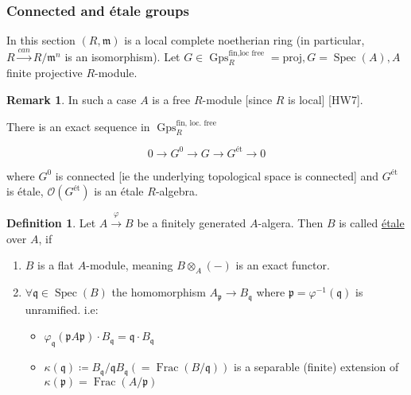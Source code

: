 \documentclass{article}
\theoremstyle{definition}
\newtheorem*{definition}{Definition}
\numberwithin{theorem}{subsection}
\newtheorem*{remark}{Remark}
\begin{document}
    \subsubsection{Connected and \'etale groups}

    In this section \((R,\mathfrak{m})\) is a local complete noetherian ring (in particular, \(R \xrightarrow{can} R / \mathfrak{m}^n\) is an isomorphism). Let \(G \in \operatorname{Gps}_R^{\text{fin,loc free}} = \text{proj}, G = \operatorname{Spec}(A), A\) finite projective \(R\)-module.
    
    \begin{remark}
        In such a case \(A\) is a free \(R\)-module [since \(R\) is local] [HW7].
    \end{remark}

    There is an exact sequence in \(\operatorname{Gps}_R^{\text{fin, loc. free}}\) 

    \[
        0 \to G^0 \to G \to G^{\text{\'et}} \to 0
    \]

    where \(G^0\) is connected [ie the underlying topological space is connected] and \(G^{\text{\'et}}\) is \'etale, \(\mathcal{O}(G^{\text{\'et}})\) is an \'etale \(R\)-algebra.
    
    \begin{definition}
        Let \(A \xrightarrow{\varphi} B\) be a finitely generated \(A\)-algera. Then \(B\) is called \underline{\'etale} over \(A\), if
        
        \begin{enumerate}[label=\arabic*)]
            \item \(B\) is a flat \(A\)-module, meaning \(B \otimes_A (-)\) is an exact functor.
            \item \(\forall \mathfrak{q} \in \operatorname{Spec}(B)\) the homomorphism \(A_{\mathfrak{p}} \to B_{\mathfrak{q}}\) where \(\mathfrak{p} = \varphi^{-1}(\mathfrak{q})\) is unramified. i.e:
            
            \begin{itemize}
                \item \(\varphi_{\mathfrak{q}}(\mathfrak{p} A \mathfrak{p}) \cdot B_{\mathfrak{q}} = \mathfrak{q} \cdot B_{\mathfrak{q}}\)
                \item \(\kappa(\mathfrak{q})\coloneqq B_{\mathfrak{q}} / \mathfrak{q} B_{\mathfrak{q}} (= \operatorname{Frac}(B / \mathfrak{q}))\) is a separable (finite) extension of \(\kappa(\mathfrak{p}) = \operatorname{Frac}(A / \mathfrak{p})\)    
            \end{itemize} 
        \end{enumerate} 
    \end{definition}
\end{document}

